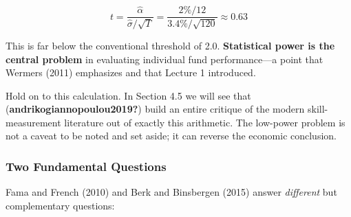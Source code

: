 \documentclass[
  letterpaper,
  DIV=11,
  numbers=noendperiod]{scrartcl}
\begin{document}
\[t = \frac{\hat{\alpha}}{\hat{\sigma}/\sqrt{T}} = \frac{2\%/12}{3.4\%/\sqrt{120}} \approx 0.63\]

This is far below the conventional threshold of 2.0. \textbf{Statistical
power is the central problem} in evaluating individual fund
performance---a point that Wermers (2011) emphasizes and that Lecture 1
introduced.

\begin{tcolorbox}[enhanced jigsaw, arc=.35mm, bottomrule=.15mm, bottomtitle=1mm, breakable, colback=white, colbacktitle=quarto-callout-important-color!10!white, colframe=quarto-callout-important-color-frame, coltitle=black, left=2mm, leftrule=.75mm, opacityback=0, opacitybacktitle=0.6, rightrule=.15mm, title=\textcolor{quarto-callout-important-color}{\faExclamation}\hspace{0.5em}{Important}, titlerule=0mm, toprule=.15mm, toptitle=1mm]

Hold on to this calculation. In Section 4.5 we will see that
(\textbf{andrikogiannopoulou2019?}) build an entire critique of the
modern skill-measurement literature out of exactly this arithmetic. The
low-power problem is not a caveat to be noted and set aside; it can
reverse the economic conclusion.

\end{tcolorbox}

\subsubsection{Two Fundamental
Questions}\label{two-fundamental-questions}

Fama and French (2010) and Berk and Binsbergen (2015) answer
\emph{different} but complementary questions:
\end{document}

